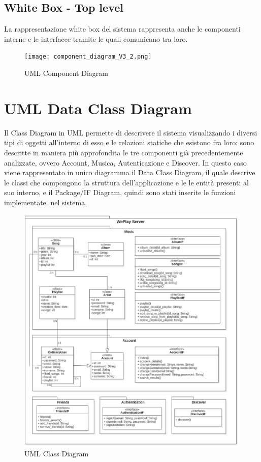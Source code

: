 \newpage
\subsection{White Box - Top level}
La rappresentazione white box del sistema rappresenta anche le componenti
interne e le interfacce tramite le quali comunicano tra loro.

\begin{figure}[H]
    \centering
    \texttt{[image: component\_diagram\_V3\_2.png]}
    \caption{UML Component Diagram}
    \label{fig-uml-component-diag_2}
\end{figure}




\newpage

\section{UML Data Class Diagram}
Il Class Diagram in UML permette di descrivere il sistema 
visualizzando i diversi tipi di oggetti all'interno di esso e le relazioni 
statiche che esistono fra loro: sono descritte in maniera più approfondita 
le tre componenti già precedentemente analizzate, ovvero Account, Musica, 
Autenticazione e Discover.
In questo caso viene rappresentato in unico diagramma il Data Class Diagram, 
il quale descrive le classi che compongono la struttura dell'applicazione e le
le entità presenti al suo interno, e il Package/IF Diagram, quindi sono stati
inserite le funzioni implementate. 
nel sistema.
\begin{figure}[H]
    \centering
    \includegraphics[scale=0.4]{images/ClassDiagram_ver3.jpg}
    \caption{UML Class Diagram}
    \label{fig-uml-class-diag}
\end{figure}
\newpage

